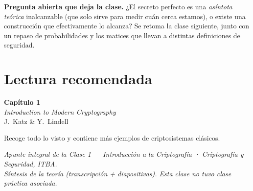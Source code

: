 \documentclass[11pt,a4paper]{article}
\begin{document}
\begin{notebox}
\textbf{Pregunta abierta que deja la clase.} ¿El secreto perfecto es una \emph{asíntota
teórica} inalcanzable (que solo sirve para medir cuán cerca estamos), o existe una
construcción que efectivamente lo alcanza? Se retoma la clase siguiente, junto con un repaso
de probabilidades y los matices que llevan a distintas definiciones de seguridad.
\end{notebox}

\section*{Lectura recomendada}
\begin{center}
\begin{tcolorbox}[enhanced,colback=itbaBlue!20,colframe=itbaCyanDark,boxrule=1pt,
  arc=3pt,width=0.85\textwidth,halign=center]
\large\textbf{Capítulo 1}\\[4pt]
\emph{Introduction to Modern Cryptography}\\[2pt]
J.~Katz \& Y.~Lindell
\end{tcolorbox}
\end{center}
\noindent Recoge todo lo visto y contiene más ejemplos de criptosistemas clásicos.

\vfill
\begin{center}\small\itshape\color{black!60}
Apunte integral de la Clase 1 — Introducción a la Criptografía · Criptografía y Seguridad, ITBA.\\
Síntesis de la teoría (transcripción + diapositivas). Esta clase no tuvo clase práctica asociada.
\end{center}
\end{document}
